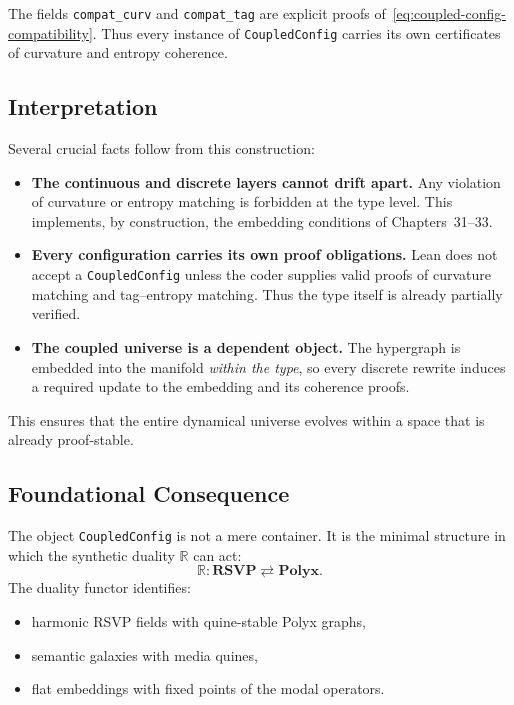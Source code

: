 The fields \texttt{compat\_curv} and \texttt{compat\_tag} are explicit proofs of~\eqref{eq:coupled-config-compatibility}.
Thus every instance of \texttt{CoupledConfig} carries its own certificates of curvature and entropy coherence.

\subsection{Interpretation}

Several crucial facts follow from this construction:

\begin{itemize}
\item \textbf{The continuous and discrete layers cannot drift apart.}  
  Any violation of curvature or entropy matching is forbidden at the type level.
  This implements, by construction, the embedding conditions of Chapters~31–33.

\item \textbf{Every configuration carries its own proof obligations.}  
  Lean does not accept a \texttt{CoupledConfig} unless the coder supplies valid proofs of curvature matching and tag–entropy matching.  
  Thus the type itself is already partially verified.

\item \textbf{The coupled universe is a dependent object.}  
  The hypergraph is embedded into the manifold \emph{within the type}, so every discrete rewrite induces a required update to the embedding and its coherence proofs.
\end{itemize}

This ensures that the entire dynamical universe evolves within a space that is already proof-stable.

\subsection{Foundational Consequence}

The object \texttt{CoupledConfig} is not a mere container.
It is the minimal structure in which the synthetic duality $\mathbb{R}$ can act:
\[
    \mathbb{R} : \mathbf{RSVP} \rightleftarrows \mathbf{Polyx}.
\]
The duality functor identifies:

\begin{itemize}
\item harmonic RSVP fields with quine-stable Polyx graphs,
\item semantic galaxies with media quines,
\item flat embeddings with fixed points of the modal operators.
\end{itemize}

